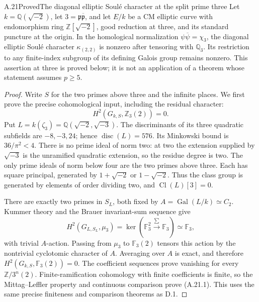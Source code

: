 \begin{statement}{A.21}{Proved}{The diagonal elliptic Soul\'e character at the split prime three}
Let \(k=\mathbb Q(\sqrt{-2})\), let
\(3=\mathfrak p\overline{\mathfrak p}\), and let \(E/k\)
be a CM elliptic curve with endomorphism ring
\(\mathbb Z[\sqrt{-2}]\), good reduction at three, and
its standard puncture at the origin. In the homological
normalization \(\psi\overline\psi=\chi_3\), the diagonal
elliptic Soul\'e character
\(\kappa_{(2,2)}\) is nonzero after tensoring with
\(\mathbb Q_3\). Its restriction to any finite-index
subgroup of its defining Galois group remains nonzero.
This assertion at three is proved below; it is not an
application of a theorem whose statement assumes
\(p\ge5\).
\end{statement}
\begin{proof}
Write \(S\) for the two primes above three and the
infinite places. We first prove the precise cohomological
input, including the residual character:
\[
 H^2(G_{k,S},\mathbb Z_3(2))=0.                         \tag{A.21.1}
\]
Put \(L=k(\zeta_3)=\mathbb Q(\sqrt{-2},\sqrt{-3})\).
The discriminants of its three quadratic subfields are
\(-8,-3,24\); hence \(\operatorname{disc}(L)=576\).
Its Minkowski bound is \(36/\pi^2<4\). There is no
prime ideal of norm two: at two the extension supplied
by \(\sqrt{-3}\) is the unramified quadratic extension,
so the residue degree is two. The only prime ideals of
norm below four are the two primes above three. Each
has square principal, generated by
\(1+\sqrt{-2}\) or \(1-\sqrt{-2}\). Thus the class
group is generated by elements of order dividing two,
and \(\operatorname{Cl}(L)[3]=0\).

There are exactly two primes in \(S_L\), both fixed by
\(A=\operatorname{Gal}(L/k)\simeq C_2\). Kummer theory
and the Brauer invariant-sum sequence give
\[
 H^2(G_{L,S_L},\mu_3)
  =\ker(\mathbb F_3^2\xrightarrow{\sum}\mathbb F_3)
  \simeq\mathbb F_3,
\]
with trivial \(A\)-action. Passing from \(\mu_3\) to
\(\mathbb F_3(2)\) tensors this action by the nontrivial
cyclotomic character of \(A\). Averaging over \(A\)
is exact, and therefore
\(H^2(G_{k,S},\mathbb F_3(2))=0\). The coefficient
sequences prove vanishing for every
\(\mathbb Z/3^n(2)\). Finite-ramification cohomology
with finite coefficients is finite, so the
Mittag--Leffler property and continuous comparison
prove (A.21.1). This uses the same precise finiteness
and comparison theorems as D.1.


\end{proof}

